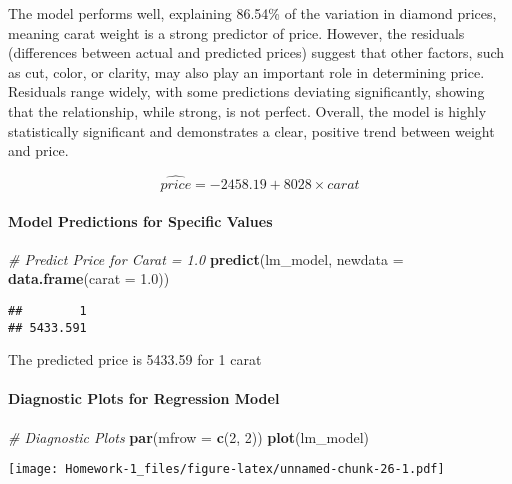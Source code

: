 \documentclass[
]{article}
\newenvironment{Shaded}{\begin{snugshade}}{\end{snugshade}}
\newcommand{\AttributeTok}[1]{\textcolor[rgb]{0.13,0.29,0.53}{#1}}
\newcommand{\CommentTok}[1]{\textcolor[rgb]{0.56,0.35,0.01}{\textit{#1}}}
\newcommand{\DecValTok}[1]{\textcolor[rgb]{0.00,0.00,0.81}{#1}}
\newcommand{\FloatTok}[1]{\textcolor[rgb]{0.00,0.00,0.81}{#1}}
\newcommand{\FunctionTok}[1]{\textcolor[rgb]{0.13,0.29,0.53}{\textbf{#1}}}
\newcommand{\NormalTok}[1]{#1}
\begin{document}
The model performs well, explaining 86.54\% of the variation in diamond
prices, meaning carat weight is a strong predictor of price. However,
the residuals (differences between actual and predicted prices) suggest
that other factors, such as cut, color, or clarity, may also play an
important role in determining price. Residuals range widely, with some
predictions deviating significantly, showing that the relationship,
while strong, is not perfect. Overall, the model is highly statistically
significant and demonstrates a clear, positive trend between weight and
price.

\[\widehat{price} = -2458.19 + 8028 \times carat\]

\paragraph{Model Predictions for Specific
Values}\label{model-predictions-for-specific-values}

\begin{Shaded}
\begin{Highlighting}[]
\CommentTok{\# Predict Price for Carat = 1.0}
\FunctionTok{predict}\NormalTok{(lm\_model, }\AttributeTok{newdata =} \FunctionTok{data.frame}\NormalTok{(}\AttributeTok{carat =} \FloatTok{1.0}\NormalTok{))}
\end{Highlighting}
\end{Shaded}

\begin{verbatim}
##        1 
## 5433.591
\end{verbatim}

The predicted price is 5433.59 for 1 carat

\paragraph{Diagnostic Plots for Regression
Model}\label{diagnostic-plots-for-regression-model}

\begin{Shaded}
\begin{Highlighting}[]
\CommentTok{\# Diagnostic Plots}
\FunctionTok{par}\NormalTok{(}\AttributeTok{mfrow =} \FunctionTok{c}\NormalTok{(}\DecValTok{2}\NormalTok{, }\DecValTok{2}\NormalTok{))}
\FunctionTok{plot}\NormalTok{(lm\_model)}
\end{Highlighting}
\end{Shaded}

\texttt{[image: Homework-1\_files/figure-latex/unnamed-chunk-26-1.pdf]}
\end{document}
